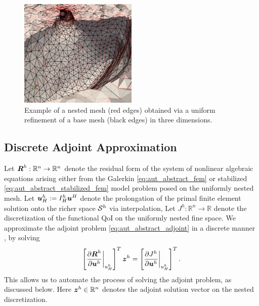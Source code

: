 \begin{figure}[ht!]
\centering
\includegraphics[width=0.5\textwidth]{img/aut_glial_nested}
\caption{Example of a nested mesh (red edges) obtained via a uniform
refinement of a base mesh (black edges) in three dimensions.}
\label{fig:aut_glial_nested}
\end{figure}

\subsection{Discrete Adjoint Approximation}

Let $\bs{R}^h : \mathbb{R}^n \to \mathbb{R}^n$ denote the residual form of
the system of nonlinear algebraic equations arising either from the Galerkin
\eqref{eq:aut_abstract_fem} or stabilized
\eqref{eq:aut_abstract_stabilized_fem}
model problem posed on the uniformly nested mesh. Let $\bs{u}^h_H :=
I^h_H \bs{u}^H$ denote the prolongation of the primal finite element solution
onto the richer space $\S^h$ via interpolation,
Let $J^h : \mathbb{R}^n \to
\mathbb{R}$ denote the discretization of the functional QoI on the
uniformly nested fine space. We approximate the adjoint problem
\eqref{eq:aut_abstract_adjoint} in a discrete manner
\cite{fidkowski2011review, venditti2000adjoint, venditti2002adjoint,
venditti2003adjoint}, by solving
%
\begin{gather}
\left[ \frac{\partial \bs{R}^h}{\partial \bs{u}^h} \biggr|_{u^h_H}
\right]^T \bs{z}^h = \left[ \frac{\partial J^h}{\partial \bs{u}^h}
\biggr|_{u^h_H} \right]^T.
\label{eq:aut_discrete_adjoint}
\end{gather}
%
This allows us to automate the process of solving the adjoint problem, as
discussed below. Here $\bs{z}^h \in \mathbb{R}^n$ denotes the adjoint
solution vector on the nested discretization.


